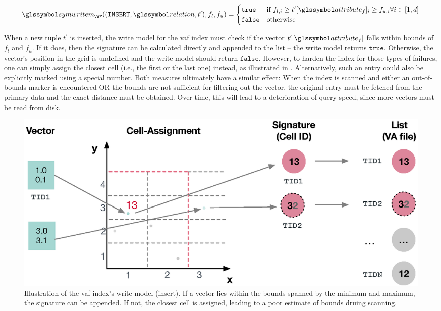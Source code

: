 \begin{equation}
    \label{equation:write_model_insert_vaf}
    \symwritem_{\mathtt{VAF}}((\mathtt{INSERT}, \relation, t^{\prime}),f_{l},f_{u}) =
    \begin{cases}
        \mathtt{true} & \text{if } f_{l,i} \geq t^{\prime}[\attribute_f]_i \geq f_{u,i} \forall i \in [1,d]\\
        \mathtt{false} & \text{otherwise}
    \end{cases}
\end{equation}

When a new tuple $t^{\prime}$ is inserted, the write model for the \acrshort{vaf} index must check if the vector $t^{\prime}[\attribute_f]$ falls within bounds of $f_{l}$ and $f_{u}$. If it does, then the signature can be calculated directly and appended to the list -- the write model returns $\mathtt{true}$. Otherwise, the vector's position in the grid is undefined and the write model should return $\mathtt{false}$. However, to harden the index for those types of failures, one can simply assign the closest cell (i.e., the first or the last one) instead, as illustrated in . Alternatively, such an entry could also be explicitly marked using a special number. Both measures ultimately have a similar effect: When the index is scanned and either an out-of-bounds marker is encountered OR the bounds are not sufficient for filtering out the vector, the original entry must be fetched from the primary data and the exact distance must be obtained. Over time, this will lead to a deterioration of query speed, since more vectors must be read from disk.

\begin{figure}
    \centering
    \includegraphics[width=\textwidth]{figures/vaf-write-model}
    \caption{Illustration of the \acrshort{vaf} index's write model (insert). If a vector lies within the bounds spanned by the minimum and maximum, the signature can be appended. If not, the closest cell is assigned, leading to a poor estimate of bounds druing scanning.}
    \label{figure:write_model_insert_vaf}
\end{figure}

